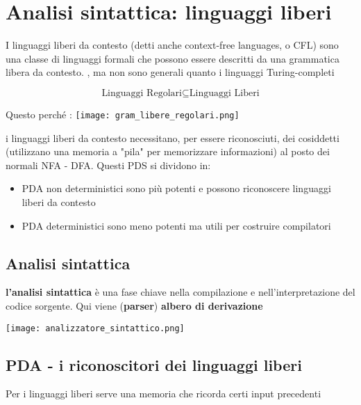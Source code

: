 \section{Analisi sintattica: linguaggi liberi}
I linguaggi liberi da contesto (detti anche context-free languages, o CFL) sono una classe di linguaggi formali che possono essere descritti da una grammatica libera da contesto. , ma non sono generali quanto i linguaggi Turing-completi

\[
        \text{Linguaggi Regolari} \subseteq \text{Linguaggi Liberi}
\]

Questo perché :
\texttt{[image: gram\_libere\_regolari.png]}

i linguaggi liberi da contesto necessitano, per essere riconosciuti, dei cosiddetti  (utilizzano una memoria a "pila" per memorizzare informazioni) al posto dei normali NFA - DFA. Questi PDS si dividono in:
\begin{itemize}
    \item PDA non deterministici sono più potenti e possono riconoscere linguaggi liberi da contesto
    \item PDA deterministici sono meno potenti ma utili per costruire compilatori
\end{itemize}  
\subsection{Analisi sintattica}

\textbf{l'analisi sintattica} è una fase chiave nella compilazione e nell'interpretazione del codice sorgente. Qui viene  (\textbf{parser})  \textbf{albero di derivazione}

\texttt{[image: analizzatore\_sintattico.png]}

\subsection{PDA - i riconoscitori dei linguaggi liberi}

Per i linguaggi liberi serve una memoria che ricorda certi input precedenti


